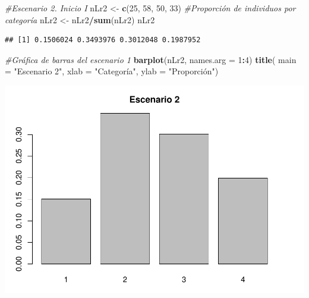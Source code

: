 \documentclass[
]{book}
\newenvironment{Shaded}{\begin{snugshade}}{\end{snugshade}}
\newcommand{\AttributeTok}[1]{\textcolor[rgb]{0.13,0.29,0.53}{#1}}
\newcommand{\CommentTok}[1]{\textcolor[rgb]{0.56,0.35,0.01}{\textit{#1}}}
\newcommand{\DecValTok}[1]{\textcolor[rgb]{0.00,0.00,0.81}{#1}}
\newcommand{\FunctionTok}[1]{\textcolor[rgb]{0.13,0.29,0.53}{\textbf{#1}}}
\newcommand{\NormalTok}[1]{#1}
\newcommand{\OtherTok}[1]{\textcolor[rgb]{0.56,0.35,0.01}{#1}}
\newcommand{\SpecialCharTok}[1]{\textcolor[rgb]{0.81,0.36,0.00}{\textbf{#1}}}
\newcommand{\StringTok}[1]{\textcolor[rgb]{0.31,0.60,0.02}{#1}}
\theoremstyle{definition}
\theoremstyle{definition}
\theoremstyle{definition}
\theoremstyle{definition}
\theoremstyle{remark}
\begin{document}
\begin{Shaded}
\begin{Highlighting}[]
\CommentTok{\#Escenario 2. Inicio I}
\NormalTok{nLr2 }\OtherTok{\textless{}{-}} \FunctionTok{c}\NormalTok{(}\DecValTok{25}\NormalTok{, }\DecValTok{58}\NormalTok{, }\DecValTok{50}\NormalTok{, }\DecValTok{33}\NormalTok{)}
\CommentTok{\#Proporción de individuos por categoría}
\NormalTok{nLr2 }\OtherTok{\textless{}{-}}\NormalTok{ nLr2}\SpecialCharTok{/}\FunctionTok{sum}\NormalTok{(nLr2)}
\NormalTok{nLr2}
\end{Highlighting}
\end{Shaded}

\begin{verbatim}
## [1] 0.1506024 0.3493976 0.3012048 0.1987952
\end{verbatim}

\begin{Shaded}
\begin{Highlighting}[]
\CommentTok{\#Gráfica de barras del escenario 1 }
\FunctionTok{barplot}\NormalTok{(nLr2, }\AttributeTok{names.arg =} \DecValTok{1}\SpecialCharTok{:}\DecValTok{4}\NormalTok{)}
\FunctionTok{title}\NormalTok{( }\AttributeTok{main =} \StringTok{"Escenario 2"}\NormalTok{, }\AttributeTok{xlab =} \StringTok{"Categoría"}\NormalTok{, }\AttributeTok{ylab =} \StringTok{"Proporción"}\NormalTok{)}
\end{Highlighting}
\end{Shaded}

\includegraphics{Diagnostico_Poblacional_files/figure-latex/chap10_4-3.pdf}
\end{document}
